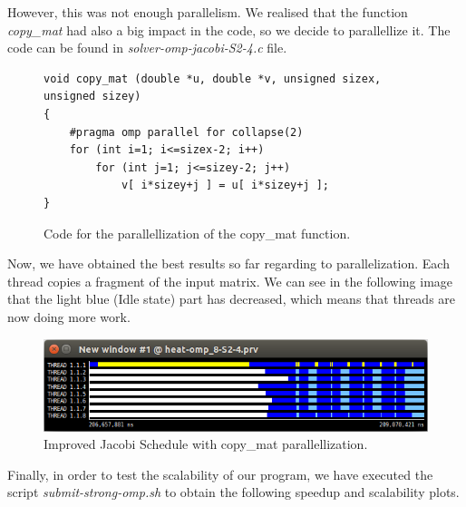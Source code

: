 \documentclass[12pt, a4paper]{article}
\begin{document}
However, this was not enough parallelism. We realised that the function \textit{copy\_mat} had also a big impact in the code, so we decide to parallellize it. The code can be found in \textit{solver-omp-jacobi-S2-4.c} file.

\begin{figure}[H]
\begin{lstlisting}
void copy_mat (double *u, double *v, unsigned sizex, unsigned sizey)
{
	#pragma omp parallel for collapse(2)
	for (int i=1; i<=sizex-2; i++)
		for (int j=1; j<=sizey-2; j++) 
			v[ i*sizey+j ] = u[ i*sizey+j ];
}
\end{lstlisting}
\caption{Code for the parallellization of the copy\_mat function.}
\end{figure}

Now, we have obtained the best results so far regarding to parallelization. Each thread copies a fragment of the input matrix. We can see in the following image that the light blue (Idle state) part has decreased, which means that threads are now doing more work.

\begin{figure}[H]
	\centering
	\includegraphics[scale=0.50]{./images/paraver-jacobi-s2-4.png}
	\caption{Improved Jacobi Schedule with copy\_mat parallellization.}
\end{figure}

Finally, in order to test the scalability of our program, we have executed the script \textit{submit-strong-omp.sh} to obtain the following speedup and scalability plots.
\end{document}
